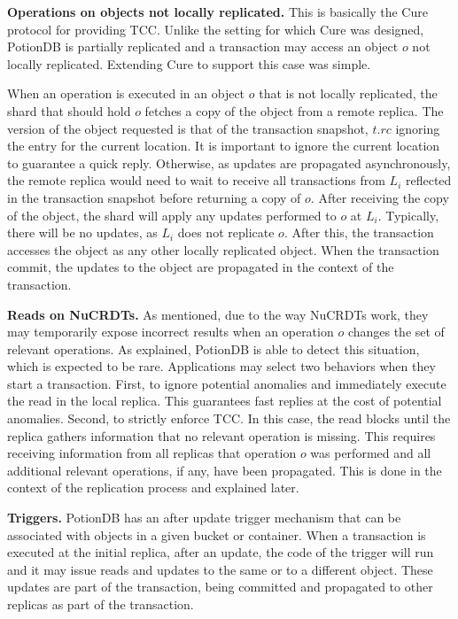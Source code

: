 \documentclass[sigplan,twocolumn,review,anonymous]{acmart}
\newcommand{\andre}[1]{\nbnote{Andre}{blue}{#1}}
\begin{document}
\noindent
\textbf{Operations on objects not locally replicated.}
This is basically the Cure~\cite{cure} protocol for providing TCC.  
Unlike the setting for which Cure was designed, PotionDB is partially replicated and a transaction 
may access an object $o$
not locally replicated.
Extending Cure to support this case was simple. 

When an operation is executed in an object $o$ that is not locally replicated, 
the shard that should hold $o$ fetches 
a copy of the object from a remote replica. The version of the object 
requested is that
of the transaction snapshot,  $t\!.\mathit{rc}$ ignoring the entry for the current location.
It is important to ignore the current location to guarantee a quick reply. 
Otherwise, as updates are propagated asynchronously, the remote replica would need to wait to
receive all transactions from $L_i$ reflected in the transaction snapshot before returning a copy
of $o$.
After receiving the copy of the object, the shard will apply any updates performed to $o$ at $L_i$. Typically,
there will be no updates, as $L_i$ does not replicate $o$.
After this, the transaction accesses the object as any other locally replicated object. When the transaction commit, 
the updates to the object are propagated in the context of the transaction.

\noindent
\textbf{Reads on NuCRDTs.}
As mentioned, due to the way NuCRDTs work, they may temporarily expose 
incorrect results when an operation $o$ changes the set of relevant operations.  
As explained, PotionDB is able to detect this situation, which is expected to be rare. 
Applications may select two behaviors when they start a transaction.
First, to ignore potential anomalies and immediately execute the read in the local replica.
This guarantees fast replies at the cost of potential anomalies. 
%
Second, to strictly enforce TCC. In this case, the read blocks until the replica gathers 
information that no relevant operation is missing. This requires receiving information from
all replicas that operation $o$ was performed and all additional relevant operations, if any, have been
propagated. This is done in the context of the replication process and explained later.

\noindent
\textbf{Triggers.}
PotionDB has an after update trigger mechanism that can be associated with 
objects in a given bucket or container.
When a transaction is executed at the initial replica, after an update, the code
of the trigger will run and it may issue reads and updates to the same or to a different object.
These updates are part of the transaction, being committed and propagated to other replicas
as part of the transaction.
\end{document}
